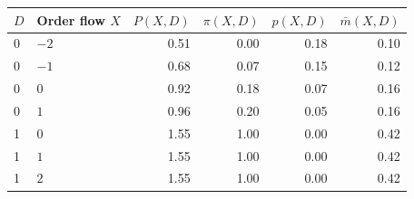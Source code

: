 \begin{tabular}{llrrrr}
\toprule
$D$ & Order flow $X$ & $P(X,D)$ & $\pi(X,D)$ & $p(X,D)$ & $\bar{m}(X,D)$ \\
\midrule
0 & $-2$ & 0.51 & 0.00 & 0.18 & 0.10 \\
0 & $-1$ & 0.68 & 0.07 & 0.15 & 0.12 \\
0 & $0$ & 0.92 & 0.18 & 0.07 & 0.16 \\
0 & $1$ & 0.96 & 0.20 & 0.05 & 0.16 \\
\midrule
1 & $0$ & 1.55 & 1.00 & 0.00 & 0.42 \\
1 & $1$ & 1.55 & 1.00 & 0.00 & 0.42 \\
1 & $2$ & 1.55 & 1.00 & 0.00 & 0.42 \\
\bottomrule
\end{tabular}
